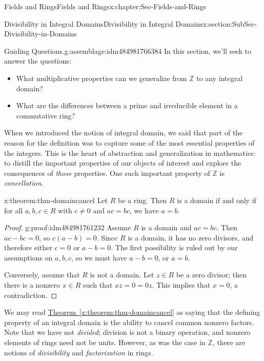 \documentclass[oneside,10pt,]{book}
\newcommand{\xreffont}{\relax}
\numberwithin{equation}{section}
\def\Z{{\mathbb Z}}
\begin{document}
\begin{chapterptx}{Fields and Rings}{}{Fields and Rings}{}{}{x:chapter:Sec-Fields-and-Rings}
\typeout{************************************************}
%
\begin{sectionptx}{Divisibility in Integral Domains}{}{Divisibility in Integral Domains}{}{}{x:section:SubSec-Divisibility-in-Domains}
\begin{assemblage}{Guiding Questions.}{g:assemblage:idm484981766384}%
In this section, we'll seek to answer the questions: %
\begin{itemize}[label=\textbullet]
\item{}What multiplicative properties can we generalize from \(\Z\) to any integral domain?%
\item{}What are the differences between a prime and irreducible element in a commutative ring?%
\end{itemize}
%
\end{assemblage}
When we introduced the notion of integral domain, we said that part of the reason for the definition was to capture some of the most essential properties of the integers. This is the heart of abstraction and generalization in mathematics: to distill the important properties of our objects of interest and explore the consequences of \emph{those} properties. One such important property of \(\Z\) is \emph{cancellation}.%
\begin{theorem}{}{}{x:theorem:thm-domaincancel}%
Let \(R\) be a ring. Then \(R\) is a domain if and only if for all \(a,b,c\in R\) with \(c\ne 0\) and \(ac = bc\), we have \(a = b\).%
\end{theorem}
\begin{proof}{}{g:proof:idm484981761232}
Assume \(R\) is a domain and \(ac = bc\). Then \(ac - bc = 0\), so \(c(a-b) = 0\). Since \(R\) is a domain, it has no zero divisors, and therefore either \(c = 0\) or \(a-b=0\). The first possibility is ruled out by our assumptions on \(a,b,c\), so we must have \(a-b = 0\), or \(a =b\).%
\par
Conversely, assume that \(R\) is not a domain. Let \(z\in R\) be a zero divisor; then there is a nonzero \(x\in R\) such that \(xz = 0 = 0 z\). This implies that \(x = 0\), a contradiction.%
\end{proof}
We may read \hyperref[x:theorem:thm-domaincancel]{Theorem~{\xreffont\ref{x:theorem:thm-domaincancel}}} as saying that the defining property of an integral domain is the ability to cancel common nonzero factors. Note that we have not \emph{divided}; division is not a binary operation, and nonzero elements of rings need not be units. However, as was the case in \(\Z\), there are notions of \emph{divisibility} and \emph{factorization} in rings.%

\end{sectionptx}
\end{chapterptx}
\end{document}
